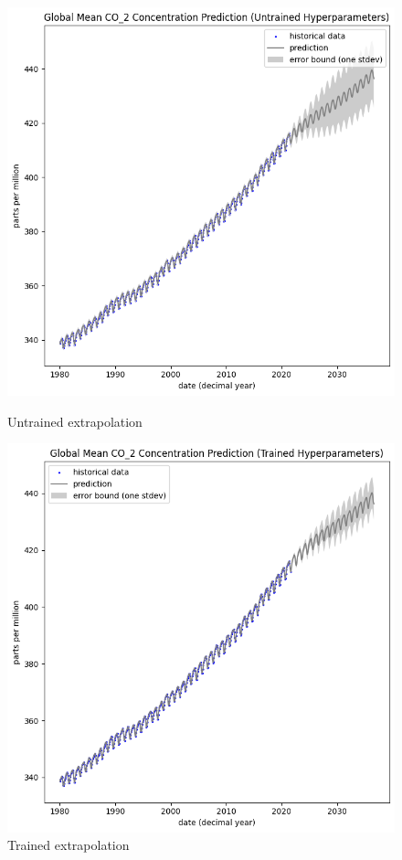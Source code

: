 \documentclass[12pt]{article}
\begin{document}
\begin{figure}[h]
\centering
\begin{minipage}{.5\textwidth}
  \centering
\includegraphics[scale=0.5]{outputs/q2/f-extrapolation-untrained}
\caption{Untrained extrapolation}
\label{fig:f-extrapolation-untrained}
\end{minipage}%
\begin{minipage}{.5\textwidth}
  \centering
\includegraphics[scale=0.5]{outputs/q2/f-extrapolation-trained}
\caption{Trained extrapolation}
\label{fig:f-extrapolation-trained}
\end{minipage}
\end{figure}
\end{document}
